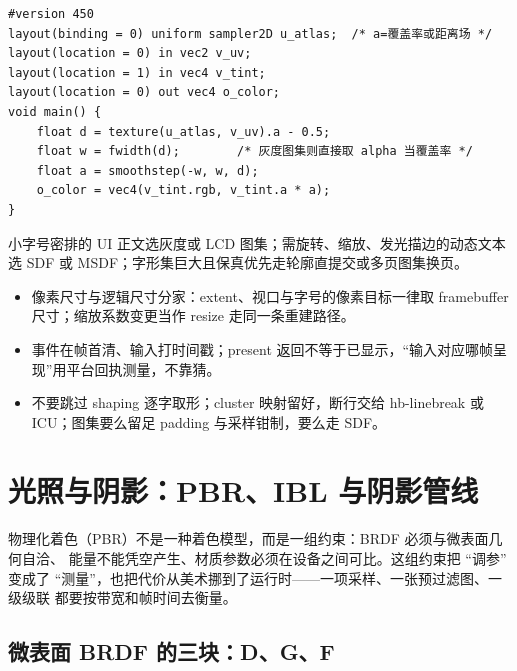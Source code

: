 \documentclass[12pt,a4paper,fontset=fandol]{ctexbook}
\begin{document}
\begin{lstlisting}[style=glslstyle,label={lst:ch12-sdf-sample},caption={图集采样与 SDF 求色的片段着色器}]
#version 450
layout(binding = 0) uniform sampler2D u_atlas;  /* a=覆盖率或距离场 */
layout(location = 0) in vec2 v_uv;
layout(location = 1) in vec4 v_tint;
layout(location = 0) out vec4 o_color;
void main() {
    float d = texture(u_atlas, v_uv).a - 0.5;
    float w = fwidth(d);        /* 灰度图集则直接取 alpha 当覆盖率 */
    float a = smoothstep(-w, w, d);
    o_color = vec4(v_tint.rgb, v_tint.a * a);
}
\end{lstlisting}

\begin{compare}[title={什么时候走哪条路}]
小字号密排的 UI 正文选灰度或 LCD 图集；需旋转、缩放、发光描边的动态文本选
SDF 或 MSDF；字形集巨大且保真优先走轮廓直提交或多页图集换页。
\end{compare}

\begin{bestpractice}[title={窗口、事件与文字三条不可越的线}]
\begin{itemize}
\item 像素尺寸与逻辑尺寸分家：extent、视口与字号的像素目标一律取 framebuffer 尺寸；缩放系数变更当作 resize 走同一条重建路径。
\item 事件在帧首清、输入打时间戳；present 返回不等于已显示，``输入对应哪帧呈现''用平台回执测量，不靠猜。
\item 不要跳过 shaping 逐字取形；cluster 映射留好，断行交给 hb-linebreak 或 ICU；图集要么留足 padding 与采样钳制，要么走 SDF。
\end{itemize}
\end{bestpractice}

\chapter{光照与阴影：PBR、IBL 与阴影管线}
\label{ch:ch12-lighting-pbr}

物理化着色（PBR）不是一种着色模型，而是一组约束：BRDF 必须与微表面几何自洽、
能量不能凭空产生、材质参数必须在设备之间可比。这组约束把 ``调参'' 变成了
``测量''，也把代价从美术挪到了运行时------一项采样、一张预过滤图、一级级联
都要按带宽和帧时间去衡量。

\section{微表面 BRDF 的三块：D、G、F}
\end{document}
